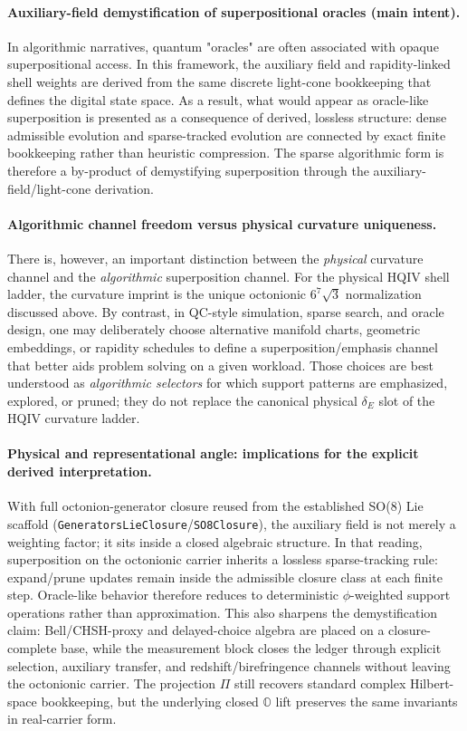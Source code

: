 \documentclass[11pt,a4paper]{article}
\theoremstyle{remark}
\begin{document}
\paragraph{Auxiliary-field demystification of superpositional oracles (main intent).}
In algorithmic narratives, quantum "oracles" are often associated with opaque superpositional access. In this framework, the auxiliary field and rapidity-linked shell weights are derived from the same discrete light-cone bookkeeping that defines the digital state space. As a result, what would appear as oracle-like superposition is presented as a consequence of derived, lossless structure: dense admissible evolution and sparse-tracked evolution are connected by exact finite bookkeeping rather than heuristic compression. The sparse algorithmic form is therefore a by-product of demystifying superposition through the auxiliary-field/light-cone derivation.

\paragraph{Algorithmic channel freedom versus physical curvature uniqueness.}
There is, however, an important distinction between the \emph{physical} curvature channel and the \emph{algorithmic} superposition channel. For the physical HQIV shell ladder, the curvature imprint is the unique octonionic $6^7\sqrt{3}$ normalization discussed above. By contrast, in QC-style simulation, sparse search, and oracle design, one may deliberately choose alternative manifold charts, geometric embeddings, or rapidity schedules to define a superposition/emphasis channel that better aids problem solving on a given workload. Those choices are best understood as \emph{algorithmic selectors} for which support patterns are emphasized, explored, or pruned; they do not replace the canonical physical $\delta_E$ slot of the HQIV curvature ladder.

\paragraph{Physical and representational angle: implications for the explicit derived interpretation.}
With full octonion-generator closure reused from the established SO(8) Lie scaffold (\texttt{GeneratorsLieClosure}/\texttt{SO8Closure}), the auxiliary field is not merely a weighting factor; it sits inside a closed algebraic structure. In that reading, superposition on the octonionic carrier inherits a lossless sparse-tracking rule: expand/prune updates remain inside the admissible closure class at each finite step. Oracle-like behavior therefore reduces to deterministic $\phi$-weighted support operations rather than approximation. This also sharpens the demystification claim: Bell/CHSH-proxy and delayed-choice algebra are placed on a closure-complete base, while the measurement block closes the ledger through explicit selection, auxiliary transfer, and redshift/birefringence channels without leaving the octonionic carrier. The projection $\Pi$ still recovers standard complex Hilbert-space bookkeeping, but the underlying closed $\mathbb{O}$ lift preserves the same invariants in real-carrier form.
\end{document}
